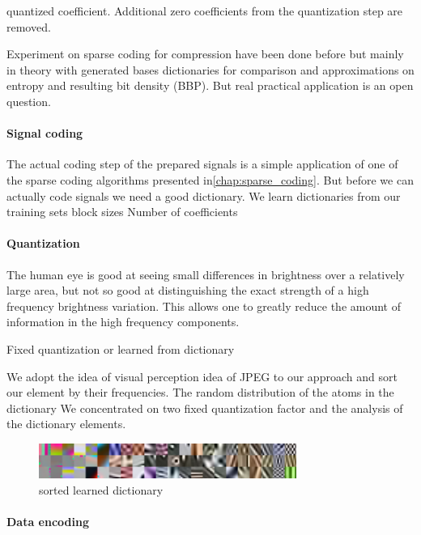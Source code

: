 quantized coefficient. Additional zero coefficients from the quantization step
are removed.


Experiment on sparse coding for compression have been done before but mainly in
theory with generated bases dictionaries for comparison and approximations on
entropy and resulting bit density (BBP). But real practical application is an
open question.



\paragraph{Signal coding}
The actual coding step of the prepared signals is a simple application of one
of the sparse coding algorithms presented in\ref{chap:sparse_coding}.
But before we can actually code signals we need a good dictionary.
We learn dictionaries from our training sets 
block sizes
Number of coefficients


\paragraph{Quantization}
The human eye is good at seeing small differences in brightness over a
relatively large area, but not so good at distinguishing the exact strength of a
high frequency brightness variation. This allows one to greatly reduce the
amount of information in the high frequency components. 

Fixed quantization or learned from dictionary

We adopt the idea of visual perception idea of JPEG to our
approach and sort our element by their frequencies.
The random distribution of the atoms in the dictionary 
We concentrated on two fixed quantization factor and the analysis of the
dictionary elements.


\begin{figure}[h]
\centering
\includegraphics[width = 0.75\textwidth]{images/sorted.png}
\caption{sorted learned dictionary}
\label{fig:sorted}
\end{figure}

\paragraph{Data encoding}

